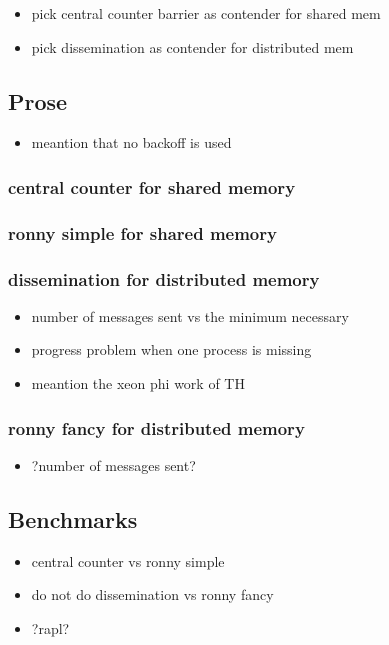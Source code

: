 \documentclass[a4paper, 10pt]{article}
\begin{document}
\begin{itemize}
	\item pick central counter barrier as contender for shared mem
	\item pick dissemination as contender for distributed mem
\end{itemize}

\subsection{Prose}
\begin{itemize}
	\item meantion that no backoff is used
\end{itemize}

\subsubsection{central counter for shared memory}
\subsubsection{ronny simple for shared memory}
\subsubsection{dissemination for distributed memory}
\begin{itemize}
	\item number of messages sent vs the minimum necessary
	\item progress problem when one process is missing
	\item meantion the xeon phi work of TH
\end{itemize}
\subsubsection{ronny fancy for distributed memory}
\begin{itemize}
	\item ?number of messages sent?
\end{itemize}

\subsection{Benchmarks}
\begin{itemize}
	\item central counter vs ronny simple
	\item do not do dissemination vs ronny fancy
	\item ?rapl?
\end{itemize}
\end{document}
